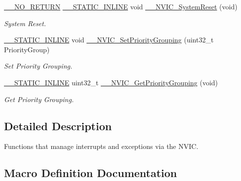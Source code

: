 \begin{DoxyCompactItemize}
\hyperlink{cmsis__iccarm_8h_a153a4a31b276a9758959580538720a51}{\+\_\+\+\_\+\+N\+O\+\_\+\+R\+E\+T\+U\+RN} \hyperlink{cmsis__iccarm_8h_aba87361bfad2ae52cfe2f40c1a1dbf9c}{\+\_\+\+\_\+\+S\+T\+A\+T\+I\+C\+\_\+\+I\+N\+L\+I\+NE} void \hyperlink{group___c_m_s_i_s___core___n_v_i_c_functions_ga0d9aa2d30fa54b41eb780c16e35b676c}{\+\_\+\+\_\+\+N\+V\+I\+C\+\_\+\+System\+Reset} (void)
\begin{DoxyCompactList}\small\item\em System Reset. \end{DoxyCompactList}\item 
\hyperlink{cmsis__iccarm_8h_aba87361bfad2ae52cfe2f40c1a1dbf9c}{\+\_\+\+\_\+\+S\+T\+A\+T\+I\+C\+\_\+\+I\+N\+L\+I\+NE} void \hyperlink{group___c_m_s_i_s___core___n_v_i_c_functions_gafc94dcbaee03e4746ade1f5bb9aaa56d}{\+\_\+\+\_\+\+N\+V\+I\+C\+\_\+\+Set\+Priority\+Grouping} (uint32\+\_\+t Priority\+Group)
\begin{DoxyCompactList}\small\item\em Set Priority Grouping. \end{DoxyCompactList}\item 
\hyperlink{cmsis__iccarm_8h_aba87361bfad2ae52cfe2f40c1a1dbf9c}{\+\_\+\+\_\+\+S\+T\+A\+T\+I\+C\+\_\+\+I\+N\+L\+I\+NE} uint32\+\_\+t \hyperlink{group___c_m_s_i_s___core___n_v_i_c_functions_ga9b894af672df4373eb637f8288845c05}{\+\_\+\+\_\+\+N\+V\+I\+C\+\_\+\+Get\+Priority\+Grouping} (void)
\begin{DoxyCompactList}\small\item\em Get Priority Grouping. \end{DoxyCompactList}\end{DoxyCompactItemize}


\subsection{Detailed Description}
Functions that manage interrupts and exceptions via the N\+V\+IC. 



\subsection{Macro Definition Documentation}
\mbox{\label{group___c_m_s_i_s___core___n_v_i_c_functions_gab2072fe50f6d7cd208f6768919f59fae}} 
